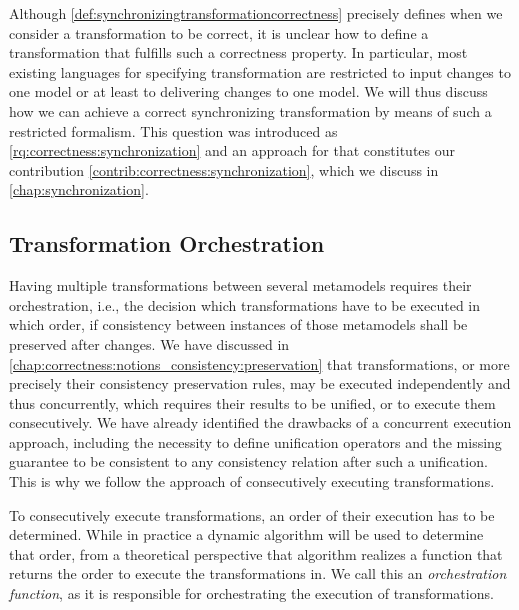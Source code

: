 Although \autoref{def:synchronizingtransformationcorrectness} precisely defines when we consider a transformation to be correct, it is unclear how to define a transformation that fulfills such a correctness property.
In particular, most existing languages for specifying transformation are restricted to input changes to one model or at least to delivering changes to one model.
We will thus discuss how we can achieve a correct synchronizing transformation by means of such a restricted formalism.
This question was introduced as \autoref{rq:correctness:synchronization} and an approach for that constitutes our contribution \autoref{contrib:correctness:synchronization}, which we discuss in \autoref{chap:synchronization}.


\subsection{Transformation Orchestration}

Having multiple transformations between several metamodels requires their orchestration, i.e., the decision which transformations have to be executed in which order, if consistency between instances of those metamodels shall be preserved after changes.
We have discussed in \autoref{chap:correctness:notions_consistency:preservation} that transformations, or more precisely their consistency preservation rules, may be executed independently and thus concurrently, which requires their results to be unified, or to execute them consecutively.
We have already identified the drawbacks of a concurrent execution approach, including the necessity to define unification operators and the missing guarantee to be consistent to any consistency relation after such a unification.
This is why we follow the approach of consecutively executing transformations.

To consecutively execute transformations, an order of their execution has to be determined.
While in practice a dynamic algorithm will be used to determine that order, from a theoretical perspective that algorithm realizes a function that returns the order to execute the transformations in.
We call this an \emph{orchestration function}, as it is responsible for orchestrating the execution of transformations.

